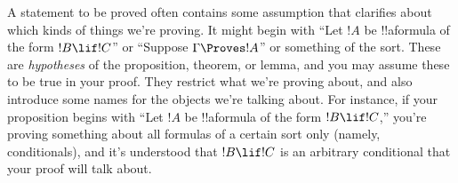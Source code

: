 \documentclass[../../../include/open-logic-section]{subfiles}
\begin{document}
A statement to be proved often contains some assumption that clarifies
about which kinds of things we're proving. It might begin
with ``Let $!A$ be !!a{formula} of the form $!B \lif !C$'' or
``Suppose $\Gamma \Proves !A$'' or something of the sort.  These are
\emph{hypotheses} of the proposition, theorem, or lemma, and you may
assume these to be true in your proof. They restrict what we're
proving about, and also introduce some names for the objects we're
talking about. For instance, if your proposition begins with ``Let
$!A$ be !!a{formula} of the form $!B \lif !C$,'' you're proving
something about all formulas of a certain sort only (namely,
conditionals), and it's understood that $!B \lif !C$ is an arbitrary
conditional that your proof will talk about.
\end{document}

